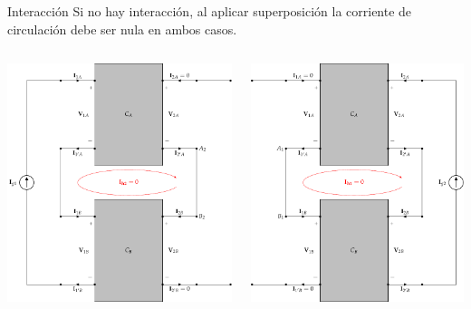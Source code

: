 \documentclass[xcolor={usenames,svgnames,dvipsnames}]{beamer}
\begin{document}
\begin{frame}[label={sec:org0818282},plain]{Interacción}
Si no hay interacción, al aplicar superposición la corriente de circulación debe ser nula \alert{en ambos casos}.
\begin{columns}
\begin{column}{0.65\columnwidth}
\begin{center}
\includegraphics[width=.9\linewidth]{../figs/serie-serie-superposicion-entrada.pdf}
\end{center}
\end{column}
\begin{column}{0.65\columnwidth}
\begin{center}
\includegraphics[width=.9\linewidth]{../figs/serie-serie-superposicion-salida.pdf}

\end{center}
\end{column}
\end{columns}
\end{frame}
\end{document}
